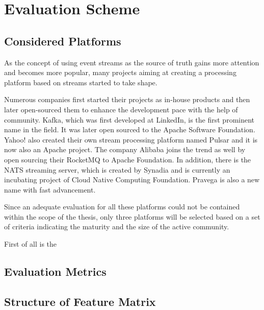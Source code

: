 \chapter{Evaluation Scheme} \label{chap:evaluation-scheme}

\section{Considered Platforms}
As the concept of using event streams as the source of truth gains more attention and becomes more popular, many projects aiming at creating a processing platform based on streams started to take shape. 

Numerous companies first started their projects as in-house products and then later open-sourced them to enhance the development pace with the help of community. Kafka, which was first developed at LinkedIn, is the first prominent name in the field. It was later open sourced to the Apache Software Foundation. Yahoo! also created their own stream processing platform named Pulsar and it is now also an Apache project. The company Alibaba joins the trend as well by open sourcing their RocketMQ to Apache Foundation. In addition, there is the NATS streaming server, which is created by Synadia and is currently an incubating project of Cloud Native Computing Foundation. Pravega is also a new name with fast advancement.

Since an adequate evaluation for all these platforms could not be contained within the scope of the thesis, only three platforms will be selected based on a set of criteria indicating the maturity and the size of the active community.

First of all is the 



\section{Evaluation Metrics}

\section{Structure of Feature Matrix}



